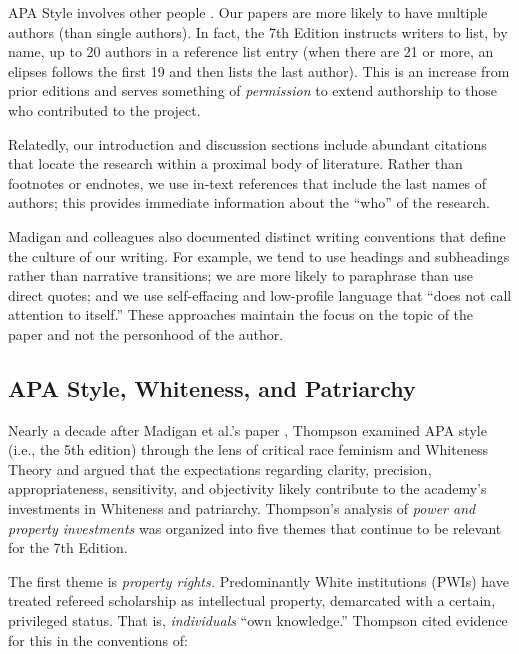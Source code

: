 \documentclass[
  11pt,
]{book}
\begin{document}
APA Style involves other people \citep{madigan_language_1995}. Our papers are more likely to have multiple authors (than single authors). In fact, the 7th Edition instructs writers to list, by name, up to 20 authors in a reference list entry (when there are 21 or more, an elipses follows the first 19 and then lists the last author). This is an increase from prior editions and serves something of \emph{permission} to extend authorship to those who contributed to the project.

Relatedly, our introduction and discussion sections include abundant citations that locate the research within a proximal body of literature. Rather than footnotes or endnotes, we use in-text references that include the last names of authors; this provides immediate information about the ``who'' of the research.

Madigan \citeyearpar{madigan_language_1995} and colleagues also documented distinct writing conventions that define the culture of our writing. For example, we tend to use headings and subheadings rather than narrative transitions; we are more likely to paraphrase than use direct quotes; and we use self-effacing and low-profile language that ``does not call attention to itself.'' These approaches maintain the focus on the topic of the paper and not the personhood of the author.

\hypertarget{apa-style-whiteness-and-patriarchy}{%
\subsection{APA Style, Whiteness, and Patriarchy}\label{apa-style-whiteness-and-patriarchy}}

Nearly a decade after Madigan et al.'s paper \citeyearpar{madigan_language_1995}, Thompson \citeyearpar{thompson_gentlemanly_2004} examined APA style (i.e., the 5th edition) through the lens of critical race feminism and Whiteness Theory and argued that the expectations regarding clarity, precision, appropriateness, sensitivity, and objectivity likely contribute to the academy's investments in Whiteness and patriarchy. Thompson's analysis of \emph{power and property investments} was organized into five themes that continue to be relevant for the 7th Edition.

The first theme is \emph{property rights.} Predominantly White institutions (PWIs) have treated refereed scholarship as intellectual property, demarcated with a certain, privileged status. That is, \emph{individuals} ``own knowledge.'' Thompson \citeyearpar{thompson_gentlemanly_2004} cited evidence for this in the conventions of:
\end{document}
